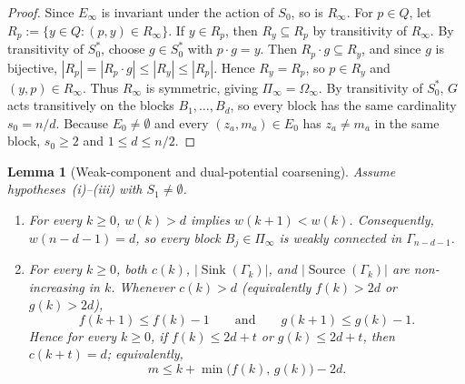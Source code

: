 \documentclass[11pt,a4paper]{article}
\newtheorem{lemma}[theorem]{Lemma}
\theoremstyle{definition}
\theoremstyle{remark}
\newcommand{\Sink}{\operatorname{Sink}}
\newcommand{\Source}{\operatorname{Source}}
\begin{document}
\begin{proof}
Since $E_\infty$ is invariant under the action of $S_0$, so is $R_\infty$. For $p \in Q$, let $R_p := \{y \in Q : (p, y) \in R_\infty\}$. If $y \in R_p$, then $R_y \subseteq R_p$ by transitivity of $R_\infty$. By transitivity of $S_0^*$, choose $g \in S_0^*$ with $p \cdot g = y$. Then $R_p \cdot g \subseteq R_y$, and since $g$ is bijective, $|R_p| = |R_p \cdot g| \le |R_y| \le |R_p|$. Hence $R_y = R_p$, so $p \in R_y$ and $(y, p) \in R_\infty$. Thus $R_\infty$ is symmetric, giving $\Pi_\infty = \Omega_\infty$. By transitivity of $S_0^*$, $G$ acts transitively on the blocks $B_1, \dots, B_d$, so every block has the same cardinality $s_0 = n / d$. Because $E_0 \neq \emptyset$ and every $(z_a, m_a) \in E_0$ has $z_a \neq m_a$ in the same block, $s_0 \ge 2$ and $1 \le d \le n / 2$.
\end{proof}

\begin{lemma}[Weak-component and dual-potential coarsening]\label{lem:coarsening}
Assume hypotheses~\textup{(i)--(iii)} with $S_1 \neq \emptyset$.
\begin{enumerate}[label=\textup{(\arabic*)},leftmargin=*,nosep]
  \item For every $k \ge 0$, $w(k) > d$ implies $w(k + 1) < w(k)$. Consequently, $w(n - d - 1) = d$, so every block $B_j \in \Pi_\infty$ is weakly connected in $\Gamma_{n - d - 1}$.
  \item For every $k \ge 0$, both $c(k)$, $|\Sink(\Gamma_k)|$, and $|\Source(\Gamma_k)|$ are non-increasing in $k$. Whenever $c(k) > d$ (equivalently $f(k) > 2d$ or $g(k) > 2d$),
  \[
    f(k + 1) \le f(k) - 1 \qquad\text{and}\qquad g(k + 1) \le g(k) - 1.
  \]
  Hence for every $k \ge 0$, if $f(k) \le 2d + t$ or $g(k) \le 2d + t$, then $c(k + t) = d$; equivalently,
  \[
    m \le k + \min\bigl(f(k),\, g(k)\bigr) - 2d.
  \]
\end{enumerate}
\end{lemma}
\end{document}
